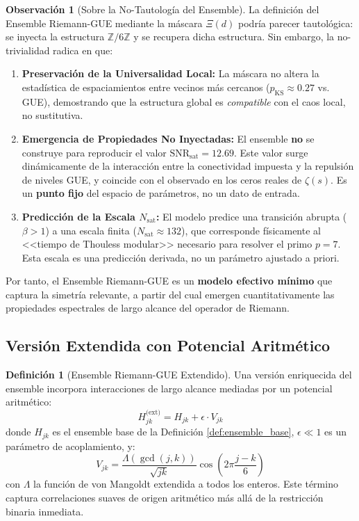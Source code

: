 \documentclass[12pt, a4paper]{article}
\theoremstyle{plain}
\theoremstyle{definition}
\newtheorem{definicion}[teorema]{Definición}
\newtheorem{observacion}[teorema]{Observación}
\theoremstyle{remark}
\begin{document}

\begin{observacion}[Sobre la No-Tautología del Ensemble]
La definición del Ensemble Riemann-GUE mediante la máscara $\Xi(d)$ podría parecer tautológica: se inyecta la estructura $\mathbb{Z}/6\mathbb{Z}$ y se recupera dicha estructura. Sin embargo, la no-trivialidad radica en que:
\begin{enumerate}
    \item \textbf{Preservación de la Universalidad Local:} La máscara no altera la estadística de espaciamientos entre vecinos más cercanos ($p_{\text{KS}} \approx 0.27$ vs. GUE), demostrando que la estructura global es \textit{compatible} con el caos local, no sustitutiva.
    \item \textbf{Emergencia de Propiedades No Inyectadas:} El ensemble \textbf{no} se construye para reproducir el valor $\mathrm{SNR}_{\text{sat}} = 12.69$. Este valor surge dinámicamente de la interacción entre la conectividad impuesta y la repulsión de niveles GUE, y coincide con el observado en los ceros reales de $\zeta(s)$. Es un \textbf{punto fijo} del espacio de parámetros, no un dato de entrada.
    \item \textbf{Predicción de la Escala $N_{\text{sat}}$:} El modelo predice una transición abrupta ($\beta > 1$) a una escala finita ($N_{\text{sat}} \approx 132$), que corresponde físicamente al <<tiempo de Thouless modular>> necesario para resolver el primo $p=7$. Esta escala es una predicción derivada, no un parámetro ajustado a priori.
\end{enumerate}
Por tanto, el Ensemble Riemann-GUE es un \textbf{modelo efectivo mínimo} que captura la simetría relevante, a partir del cual emergen cuantitativamente las propiedades espectrales de largo alcance del operador de Riemann.
\end{observacion}

\subsection{Versión Extendida con Potencial Aritmético}
\label{subsec:version_extendida}

\begin{definicion}[Ensemble Riemann-GUE Extendido]
Una versión enriquecida del ensemble incorpora interacciones de largo alcance mediadas por un potencial aritmético:
\[
H_{jk}^{\text{(ext)}} = H_{jk} + \epsilon \cdot V_{jk}
\]
donde $H_{jk}$ es el ensemble base de la Definición \ref{def:ensemble_base}, $\epsilon \ll 1$ es un parámetro de acoplamiento, y:
\[
V_{jk} = \frac{\Lambda(\gcd(j,k))}{\sqrt{jk}} \cos\left(2\pi\frac{j-k}{6}\right)
\]
con $\Lambda$ la función de von Mangoldt extendida a todos los enteros. Este término captura correlaciones suaves de origen aritmético más allá de la restricción binaria inmediata.
\end{definicion}
\end{document}
